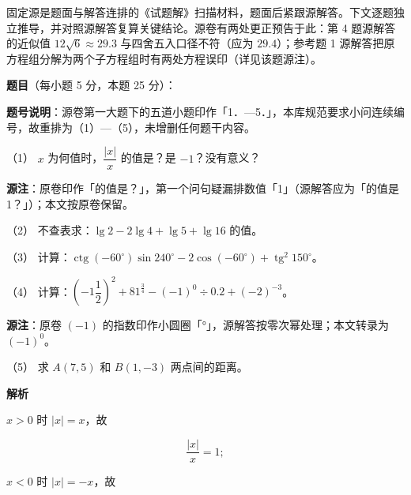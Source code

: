 

\begin{gktip}
固定源是题面与解答连排的《试题解》扫描材料，题面后紧跟源解答。下文逐题独立推导，并对照源解答复算关键结论。源卷有两处更正预告于此：第 4 题源解答的近似值 $12\sqrt6\approx29.3$ 与四舍五入口径不符（应为 $29.4$）；参考题 1 源解答把原方程组分解为两个子方程组时有两处方程误印（详见该题源注）。
\end{gktip}

\begin{answer}

\textbf{题目}（每小题 5 分，本题 25 分）：

\begin{gktip}
\textbf{题号说明}：源卷第一大题下的五道小题印作「1．—5．」，本库规范要求小问连续编号，故重排为（1）—（5），未增删任何题干内容。
\end{gktip}

（1） $x$ 为何值时，$\dfrac{|x|}{x}$ 的值是？是 $-1$？没有意义？

\begin{gktip}
\textbf{源注}：原卷印作「的值是？」，第一个问句疑漏排数值「1」（源解答应为「的值是 1？」）；本文按原卷保留。
\end{gktip}

（2） 不查表求：$\lg 2-2\lg 4+\lg 5+\lg 16$ 的值。

（3） 计算：$\operatorname{ctg}(-60^\circ)\sin 240^\circ-2\cos(-60^\circ)+\operatorname{tg}^2 150^\circ$。

（4） 计算：$\left(-1\dfrac12\right)^2+81^{\frac34}-(-1)^0\div 0.2+(-2)^{-3}$。

\begin{gktip}
\textbf{源注}：原卷 $(-1)$ 的指数印作小圆圈「°」，源解答按零次幂处理；本文转录为 $(-1)^0$。
\end{gktip}

（5） 求 $A(7,5)$ 和 $B(1,-3)$ 两点间的距离。

\textbf{解析}


$x>0$ 时 $|x|=x$，故

\nopagebreak[4]
\[
\frac{|x|}{x}=1;
\]

$x<0$ 时 $|x|=-x$，故


\end{answer}
